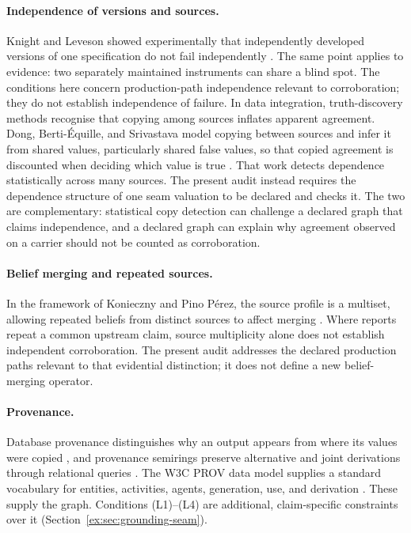 \documentclass[11pt]{article}
\theoremstyle{definition}
\begin{document}
\paragraph{Independence of versions and sources.} Knight and Leveson showed experimentally that independently developed versions of one specification do not fail independently \citep{knightleveson1986}. The same point applies to evidence: two separately maintained instruments can share a blind spot. The conditions here concern production-path independence relevant to corroboration; they do not establish independence of failure. In data integration, truth-discovery methods recognise that copying among sources inflates apparent agreement. Dong, Berti-\'Equille, and Srivastava model copying between sources and infer it from shared values, particularly shared false values, so that copied agreement is discounted when deciding which value is true \citep{dong2009}. That work detects dependence statistically across many sources. The present audit instead requires the dependence structure of one seam valuation to be declared and checks it. The two are complementary: statistical copy detection can challenge a declared graph that claims independence, and a declared graph can explain why agreement observed on a carrier should not be counted as corroboration.

\paragraph{Belief merging and repeated sources.}
In the framework of Konieczny and Pino P\'erez, the source profile
is a multiset, allowing repeated beliefs from distinct sources to
affect merging \citep{konieczny2002merging}. Where reports repeat
a common upstream claim, source multiplicity alone does not establish
independent corroboration. The present audit addresses the declared
production paths relevant to that evidential distinction; it does
not define a new belief-merging operator.

\paragraph{Provenance.} Database provenance distinguishes why an output appears from where its values were copied \citep{buneman2001}, and provenance semirings preserve alternative and joint derivations through relational queries \citep{greenkarvounarakistannen2007}. The W3C PROV data model supplies a standard vocabulary for entities, activities, agents, generation, use, and derivation \citep{w3cprovdm2013}. These supply the graph. Conditions (L1)--(L4) are additional, claim-specific constraints over it (Section~\ref{ex:sec:grounding-seam}).
\end{document}
